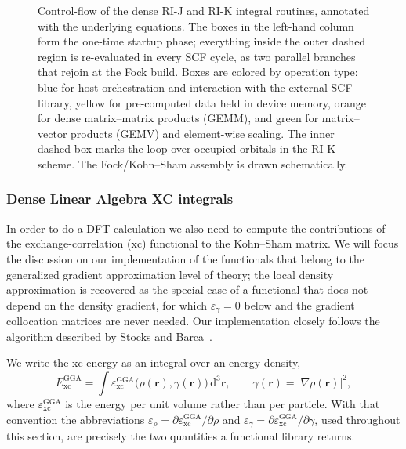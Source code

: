 \documentclass{article}
\begin{document}
\begin{figure}[H]
  \caption{Control-flow of the dense RI-J and RI-K integral routines,
    annotated with the underlying equations. The boxes in the left-hand
    column form the one-time startup phase; everything inside the outer
    dashed region is re-evaluated in every SCF cycle, as two parallel
    branches that rejoin at the Fock build. Boxes are colored by
    operation type: blue for host orchestration and interaction with
    the external SCF library, yellow for pre-computed data held in
    device memory, orange for dense matrix--matrix products (GEMM), and
    green for matrix--vector products (GEMV) and element-wise scaling.
    The inner dashed box marks the loop over occupied orbitals in the
  RI-K scheme. The Fock/Kohn--Sham assembly is drawn schematically.}
  \label{fig:dense_ri_flow}
\end{figure}

\subsubsection{Dense Linear Algebra XC integrals}\label{subsubsec:dense_la_xc}

In order to do a DFT calculation we also need to compute the contributions
of the exchange-correlation (xc) functional to the Kohn--Sham matrix.
We will focus the discussion on our implementation of the functionals
that belong to the generalized gradient approximation level of theory;
the local density approximation is recovered as the special case of a
functional that does not depend on the density gradient, for which
\( \varepsilon_\gamma = 0 \) below and the gradient collocation
matrices are never needed. Our implementation closely follows the
algorithm described by Stocks and Barca~\cite{Stocks_2025}.

We write the xc energy as an integral over an energy density,
\begin{equation}
  E_\text{xc}^\text{GGA} = \int \varepsilon_\text{xc}^\text{GGA}
  \big(\rho(\mathbf r), \gamma(\mathbf r)\big)\,\mathrm d ^3 \mathbf r,
  \qquad \gamma(\mathbf r) = |\nabla \rho(\mathbf r)|^2,
  \label{eq:E_xc_gga}
\end{equation}
where \( \varepsilon_\text{xc}^\text{GGA} \) is the energy per unit
volume rather than per particle. With that convention the
abbreviations
\( \varepsilon_\rho = \partial \varepsilon_\text{xc}^\text{GGA} /
\partial \rho \) and
\( \varepsilon_\gamma = \partial \varepsilon_\text{xc}^\text{GGA} /
\partial \gamma \), used throughout this section, are precisely the two
quantities a functional library returns.
\end{document}
